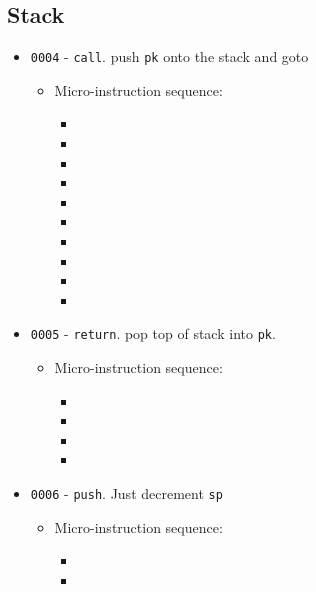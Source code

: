 \documentclass{article}
\begin{document}
\subsection{Stack}
\begin{itemize}
    \item \Verb|0004| - \Verb|call|. push \Verb|pk| onto the stack and goto
    \begin{itemize}
        \item Micro-instruction sequence:
        \begin{itemize}
            \item \pkptroutinc
            \item \datatotmpa
            \item \incrementpk
            \item \decrementsp
            \item \sptoaddr
            \item \pktodata
            \item \writeRAM
            \item \tmpatodata
            \item \datatopk
            \item \done
        \end{itemize}
    \end{itemize}

    \item \Verb|0005| - \Verb|return|. pop top of stack into \Verb|pk|.
    \begin{itemize}
        \item Micro-instruction sequence:
        \begin{itemize}
            \item \spptrout
            \item \datatopk
            \item \incrementsp
            \item \done
        \end{itemize}
    \end{itemize}

    \item \Verb|0006| - \Verb|push|. Just decrement \Verb|sp|
    \begin{itemize}
        \item Micro-instruction sequence:
        \begin{itemize}
            \item \decrementsp
            \item \done
        \end{itemize}
    \end{itemize}
    

\end{itemize}
\end{document}
